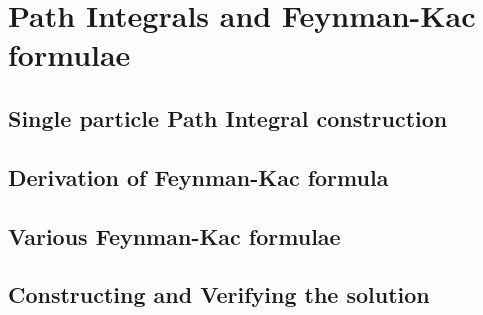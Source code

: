 \chapter{Path Integrals and Feynman-Kac formulae}

\section{ Single particle Path Integral construction}

\section{Derivation of Feynman-Kac formula }


\section{Various Feynman-Kac formulae}


\section{Constructing and Verifying the solution}

